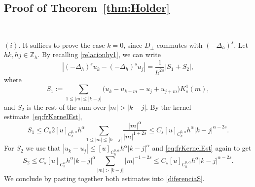 \documentclass[a4paper,11pt,reqno]{amsart}
\newcommand{\Z}{\mathbb{Z}}
\theoremstyle{definition}
\numberwithin{equation}{section}
\begin{document}
\subsection{Proof of Theorem~\ref{thm:Holder}}~

\noindent$(i)$. It suffices to prove the case $k=0$,
since $D_{\pm}$ commutes with $(-\Delta_h)^s$.
Let $hk,hj\in\Z_h$. By recalling \eqref{relacionhy1}, we can write
\begin{equation}
\label{diferenciaS}
|(-\Delta_h)^su_{k}-(-\Delta_h)^su_{j}|= \frac{1}{h^{2s}}|S_1+S_2|,
\end{equation}
where
\begin{equation}
\label{S1}
S_1 := \sum_{1\leq|m|\le|k-j|}\big(u_{k}-u_{k+m}-u_{j}+u_{j+m}\big)K^1_s(m),
\end{equation}
and $S_2$ is the rest of the sum over $|m|>|k-j|$.
By the kernel estimate~\eqref{eq:frKernelEst},
\[
S_1 \le C_{s}2[u]_{C_h^{0,\alpha}}h^{\alpha} \sum_{1\leq|m|\le|k-j|}
\frac{|m|^{\alpha}}{|m|^{1+2s}} \le C_{s}
[u]_{C_h^{0,\alpha}}h^{\alpha}|k-j|^{\alpha-2s}.
\]
For $S_2$ we use that $|u_{k}-u_{j}|\le [u]_{C_h^{0,\alpha}}h^{\alpha}|k-j|^{\alpha}$ and
\eqref{eq:frKernelEst} again to get
\[
S_2\le C_{s}[u]_{C_h^{\alpha}}h^{\alpha}|k-j|^{\alpha} \sum_{|m|>|k-j|}|m|^{-1-2s}\le C_{s}
[u]_{C_h^{0,\alpha}}h^{\alpha}|k-j|^{\alpha-2s}.
\]
We conclude by pasting together both estimates into \eqref{diferenciaS}.
\end{document}
